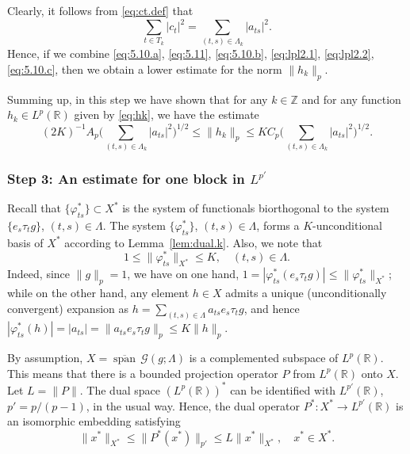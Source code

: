 \documentclass[reqno,a4paper,12pt]{amsart}
\numberwithin{equation}{section}
\numberwithin{figure}{section}
\newcommand\R{\mathbb{R}}
\newcommand\Z{\mathbb{Z}}
\newcommand\G{\mathcal{G}}
\newcommand\1{\mathds{1}}
\newcommand{\pphi}{\varphi}
\newcommand{\TTT}{T}
\newcommand{\ts}{\tau}
\renewcommand\le{\leqslant}
\newcommand{\cspan}{\overline{\operatorname{span}}}
\theoremstyle{plain}
\newcommand{\lemref}[1]{Lemma~\ref{#1}}
\theoremstyle{definition}
\begin{document}
Clearly, it follows from \eqref{eq:ct.def} that
\begin{equation}
\label{eq:5.10.c}
\sum_{t\in \TTT_k} |c_t|^2 = \sum_{(t,s)\in\Lambda_k}|a_{ts}|^2.
\end{equation}
Hence, if we combine \eqref{eq:5.10.a}, \eqref{eq:5.11}, \eqref{eq:5.10.b}, 
\eqref{eq:lpl2.1}, \eqref{eq:lpl2.2}, \eqref{eq:5.10.c}, then
we obtain a lower estimate for the norm $\|h_k\|_p$.



Summing up, in this step we have shown that for any $k\in\Z$ and for any function $h_k \in L^p(\R)$ given by \eqref{eq:hk}, we have the estimate
\begin{equation}
\label{eq:5.17}
(2K)^{-1} A_p \Big( \sum_{(t,s)\in\Lambda_k}|a_{ts}|^2 \Big)^{1/2} \le \|h_{k}\|_p\le K C_p \Big( \sum_{(t,s)\in\Lambda_k}|a_{ts}|^2 \Big)^{1/2}.
\end{equation}




\subsubsection{Step 3: An estimate for one block in $L^{p'}$}
Recall that $\{\pphi_{ts}^*\} \subset X^*$ is the
system of functionals biortho\-gonal to the system $\{e_s\tau_t g\}$, $(t,s)\in\Lambda$. 
The system $\{\pphi_{ts}^*\}$,  $(t,s)\in \Lambda$,  forms a
$K$-unconditional basis of $X^*$  according to \lemref{lem:dual.k}.
Also, we note that
\begin{equation}
\label{eq:pphits.k}
1 \le  \| \pphi_{ts}^* \|_{X^*} \le K, \quad (t,s)\in \Lambda.
\end{equation}
Indeed, since $\|g\|_p = 1$,  we have on one hand,
$1 = |\pphi_{ts}^* (e_s \ts_t g)| \le \|\pphi_{ts}^*\|_{X^*}$;
while on the other hand,
any element $h \in X$ admits a unique (unconditionally convergent) 
expansion as $h = \sum_{(t,s)\in\Lambda}  a_{ts} e_s \ts_t g$,
and hence
$|\pphi_{ts}^*(h)| = | a_{ts}| = \|  a_{ts} e_s \ts_t g \|_p \le K \|h\|_p$.



By assumption, $X= \cspan \,  \G(g;\Lambda)$
is a complemented subspace of $L^p(\R)$. This means that
there is a bounded projection  operator $P$ from
$L^p(\R) $  onto $ X$. Let $L = \|P\|$.
The dual space $(L^p(\R))^*$ 
can be identified with $L^{p'}(\R)$, $p' = p/(p-1)$,
in the usual way. Hence, the 
dual operator $P^* : X^* \to L^{p'}(\R)$
is an isomorphic embedding satisfying 
\begin{equation}
\label{eq:dual_proj}
	\|x^*\|_{X^*} \le\|P^*(x^*)\|_{p'} \le L \|x^*\|_{X^*}, \quad x^* \in X^*.
\end{equation}
\end{document}
